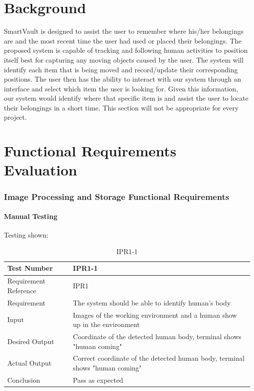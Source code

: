 \documentclass[12pt, titlepage]{article}
\begin{document}
\section{Background}	
SmartVault is designed to assist the user to remember where his/her belongings are and the most recent time the user had used or placed their belongings. The proposed system is capable of tracking and following human activities to position itself best for capturing any moving objects caused by the user. The system will identify each item that is being moved and record/update their corresponding positions. The user then has the ability to interact with our system through an interface and select which item the user is looking for. Given this information, our system would identify where that specific item is and assist the user to locate their belongings in a short time.
This section will not be appropriate for every project.
~\newpage
\section{Functional Requirements Evaluation}

\subsubsection{Image Processing and Storage Functional Requirements}
		
\paragraph{Manual Testing}{Testing shown:}
\begin{table}[H]
\begin{center}
\begin{tabular}{|l | m{9cm}|}
\hline
  Test Number & IPR1-1\\
  \hline
  Requirement Reference & IPR1\\
  \hline
  Requirement &  The system should be able to identify human’s body\\
  \hline
  Input & Images of the working environment and a human show up in
the environment\\
  \hline
  Desired Output & Coordinate of the detected human body, terminal shows "human coming"\\
  \hline
  Actual Output & Correct coordinate of the detected human body, terminal shows "human coming"\\
  \hline
  Conclusion & Pass as expected\\
  \hline
\end{tabular}
\end{center}   
\caption{IPR1-1}
\end{table}
\end{document}
